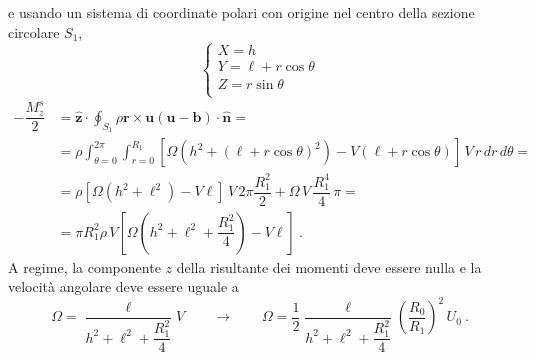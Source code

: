 e usando un sistema di coordinate polari con origine nel centro della sezione circolare $S_1$,
\begin{equation}
\begin{cases}
 X = h \\
 Y = \ell + r \cos\theta \\
 Z = r \sin\theta \\
\end{cases}
\end{equation}
\begin{equation}
\begin{aligned}
 - \dfrac{M_z^s}{2} & = \bm{\hat{z}} \cdot \oint_{S_1} \rho \bm{r} \times \bm{u} \left( \bm{u} - \bm{b} \right) \cdot \bm{\hat{n}} = \\
  & = \rho \int_{\theta=0}^{2\pi}\int_{r=0}^{R_1}
    \left[ \Omega\left( h^2 + (\ell + r \cos\theta)^2 \right) - V \left( \ell + r \cos \theta \right)  \right] \, V \,  r \, dr \, d\theta = \\
  & = \rho \left[ \Omega \left( h^2 + \ell^2 \right) - V \ell \right] \, V \, 2 \pi \dfrac{R_1^2}{2} +
   \Omega \, V \, \dfrac{R_1^4}{4}\, \pi = \\
 & = \pi R_1^2 \rho \, V \left[ \Omega \left( h^2 + \ell^2 + \dfrac{R_1^2}{4} \right) - V \ell \right] \ .
\end{aligned}
\end{equation}
A regime, la componente $z$ della risultante dei momenti deve essere nulla e la velocità angolare deve essere uguale a
\begin{equation}
 \Omega = \dfrac{\ell}{h^2 + \ell^2 + \dfrac{R_1^2}{4}} V
 \qquad \rightarrow \qquad
 \Omega = \dfrac{1}{2}\dfrac{\ell}{h^2 + \ell^2 + \dfrac{R_1^2}{4}} \left( \dfrac{R_0}{R_1} \right)^2 \, U_0 \ .
\end{equation}
